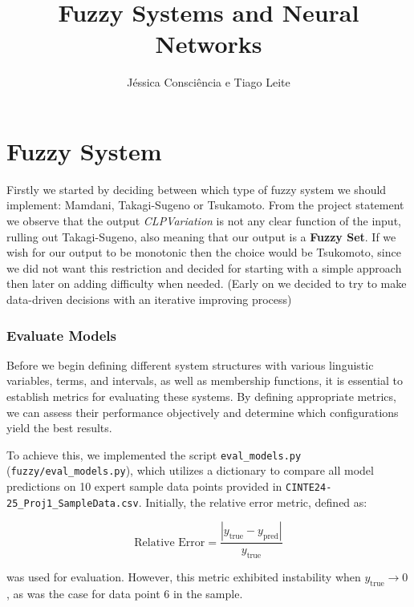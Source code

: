\documentclass[titlepage]{article}
\title{Fuzzy Systems and Neural Networks}
\author{Jéssica Consciência e Tiago Leite}
\begin{document}
\maketitle
\newpage


\part{Fuzzy System}

Firstly we started by deciding between which type of fuzzy system
we should implement: Mamdani, Takagi-Sugeno or Tsukamoto.
From the project statement we observe that the output \textit{CLPVariation}
is not any clear function of the input, rulling out Takagi-Sugeno,
also meaning that our output is a \textbf{Fuzzy Set}. If we wish for
our output to be monotonic then the choice would be Tsukomoto, since
we did not want this restriction and decided for starting with a simple
approach then later on adding difficulty when needed.
(Early on we decided to try to make data-driven decisions with an iterative
improving process)

\section{Evaluate Models}

Before we begin defining different system structures with various linguistic variables, terms, and intervals, as well as membership functions, it is essential to establish metrics for evaluating these systems.
By defining appropriate metrics, we can assess their performance objectively and determine which configurations yield the best results.

To achieve this, we implemented the script \texttt{eval\_models.py} (\texttt{fuzzy/eval\_models.py}),
which utilizes a dictionary to compare all model predictions on 10 expert sample data points provided in \newline \texttt{CINTE24-25\_Proj1\_SampleData.csv}.
Initially, the relative error metric, defined as:

\begin{equation*}
    \text{Relative Error} = \frac{|y_{\text{true}} - y_{\text{pred}}|}{y_{\text{true}}}
\end{equation*}

was used for evaluation.
However, this metric exhibited instability when $y_{\text{true}} \to 0$, as was the case for data point 6 in the sample.

\end{document}
